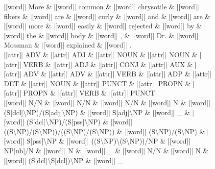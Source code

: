 \documentclass[10pt,a4paper]{article}
\begin{document}
\begin{figure}[h]
{\begin{dependency}[theme = simple]
\begin{deptext}[column sep=1em, row sep=0.1em]
|[word]| More \& |[word]| common \& |[word]| chrysotile \& |[word]| fibers \& |[word]| are \& |[word]| curly \& |[word]| and \& |[word]| are \& |[word]| more \& |[word]| easily \& |[word]| rejected \& |[word]| by \& |[word]| the \& |[word]| body \& |[word]| , \& |[word]| Dr. \& |[word]| Mossman \& |[word]| explained \& |[word]| . \\
|[attr]| ADV \& |[attr]| ADJ \& |[attr]| NOUN \& |[attr]| NOUN \& |[attr]| VERB \& |[attr]| ADJ \& |[attr]| CONJ \& |[attr]| AUX \& |[attr]| ADV \& |[attr]| ADV \& |[attr]| VERB \& |[attr]| ADP \& |[attr]| DET \& |[attr]| NOUN \& |[attr]| PUNCT \& |[attr]| PROPN \& |[attr]| PROPN \& |[attr]| VERB \& |[attr]| PUNCT \\
|[word]| N/N \& |[word]| N/N \& |[word]| N/N \& |[word]| N \& |[word]| (S{[}dcl{]}\textbackslash{}NP)/(S{[}adj{]}\textbackslash{}NP) \& |[word]| S{[}adj{]}\textbackslash{}NP \& |[word]| \_ \& |[word]| (S{[}dcl{]}\textbackslash{}NP)/(S{[}pss{]}\textbackslash{}NP) \& |[word]| ((S\textbackslash{}NP)/(S\textbackslash{}NP))/((S\textbackslash{}NP)/(S\textbackslash{}NP)) \& |[word]| (S\textbackslash{}NP)/(S\textbackslash{}NP) \& |[word]| S{[}pss{]}\textbackslash{}NP \& |[word]| ((S\textbackslash{}NP)\textbackslash{}(S\textbackslash{}NP))/NP \& |[word]| NP{[}nb{]}/N \& |[word]| N \& |[word]| \_ \& |[word]| N/N \& |[word]| N \& |[word]| (S{[}dcl{]}\textbackslash{}S{[}dcl{]})\textbackslash{}NP \& |[word]| \_ \\
\end{deptext}





\end{dependency}}
\end{figure}
\end{document}
